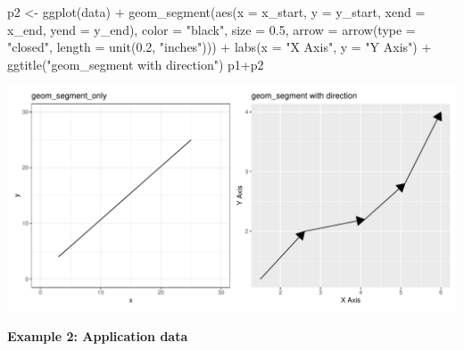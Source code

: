 \documentclass[
  letterpaper,
  DIV=11,
  numbers=noendperiod]{scrreprt}
\newenvironment{Shaded}{\begin{snugshade}}{\end{snugshade}}
\newcommand{\AttributeTok}[1]{\textcolor[rgb]{0.40,0.45,0.13}{#1}}
\newcommand{\FloatTok}[1]{\textcolor[rgb]{0.68,0.00,0.00}{#1}}
\newcommand{\FunctionTok}[1]{\textcolor[rgb]{0.28,0.35,0.67}{#1}}
\newcommand{\NormalTok}[1]{\textcolor[rgb]{0.00,0.23,0.31}{#1}}
\newcommand{\OtherTok}[1]{\textcolor[rgb]{0.00,0.23,0.31}{#1}}
\newcommand{\SpecialCharTok}[1]{\textcolor[rgb]{0.37,0.37,0.37}{#1}}
\newcommand{\StringTok}[1]{\textcolor[rgb]{0.13,0.47,0.30}{#1}}
\begin{document}
\begin{Shaded}
\begin{Highlighting}[]
\NormalTok{p2 }\OtherTok{\textless{}{-}} \FunctionTok{ggplot}\NormalTok{(data) }\SpecialCharTok{+}
  \FunctionTok{geom\_segment}\NormalTok{(}\FunctionTok{aes}\NormalTok{(}\AttributeTok{x =}\NormalTok{ x\_start, }\AttributeTok{y =}\NormalTok{ y\_start, }\AttributeTok{xend =}\NormalTok{ x\_end, }\AttributeTok{yend =}\NormalTok{ y\_end),}
               \AttributeTok{color =} \StringTok{"black"}\NormalTok{, }\AttributeTok{size =} \FloatTok{0.5}\NormalTok{, }
               \AttributeTok{arrow =} \FunctionTok{arrow}\NormalTok{(}\AttributeTok{type =} \StringTok{"closed"}\NormalTok{, }\AttributeTok{length =} \FunctionTok{unit}\NormalTok{(}\FloatTok{0.2}\NormalTok{, }\StringTok{"inches"}\NormalTok{))) }\SpecialCharTok{+}
  \FunctionTok{labs}\NormalTok{(}\AttributeTok{x =} \StringTok{"X Axis"}\NormalTok{,}
       \AttributeTok{y =} \StringTok{"Y Axis"}\NormalTok{) }\SpecialCharTok{+}
  \FunctionTok{ggtitle}\NormalTok{(}\StringTok{"geom\_segment with direction"}\NormalTok{)}
\NormalTok{p1}\SpecialCharTok{+}\NormalTok{p2}
\end{Highlighting}
\end{Shaded}

\includegraphics{s_files/figure-pdf/unnamed-chunk-4-1.pdf}

\textbf{Example 2: Application data}
\end{document}
